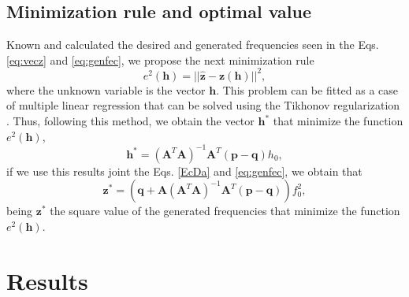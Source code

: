 \documentclass[11pt,twocolumn]{article}
\begin{document}
\subsection{Minimization rule and optimal value}
Known and calculated the desired and generated frequencies seen in the Eqs. \ref{eq:vecz} and \ref{eq:genfec},
we propose the next minimization rule
\begin{equation}
\label{eq:minimization}
e^2(\mathbf{h})= || \mathbf{\hat{z}} - \mathbf{z}(\mathbf{h}) ||^2,
\end{equation}
where the unknown variable is the vector $\mathbf{h}$.
This problem can be fitted as a case of multiple linear regression 
that can be solved using the Tikhonov regularization
\cite[pp. 79, 80]{pujaicoriverafernando2020}.
Thus, following this method, we obtain the vector $\mathbf{h}^{*}$ that minimize the function $e^2(\mathbf{h})$,
\begin{equation}
\label{eq:optimalh}
\mathbf{h}^{*}=
 \left(\mathbf{A}^T\mathbf{A}\right)^{-1}\mathbf{A}^T
 \left(\mathbf{p}-\mathbf{q}\right)
h_0,
\end{equation}
if we use this results joint the Eqs. \ref{EcDa} and \ref{eq:genfec}, 
we obtain that
\begin{equation}
\mathbf{z}^{*}=
\left(\mathbf{q}
+\mathbf{A}\left(\mathbf{A}^T\mathbf{A}\right)^{-1}\mathbf{A}^T
 \left(\mathbf{p}-\mathbf{q}\right) \right)
f_0^2,
\end{equation}
being $\mathbf{z}^{*}$ the square value of the generated frequencies
that minimize the function $e^2(\mathbf{h})$.

\section{Results}
\end{document}
